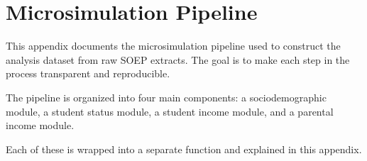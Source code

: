 
%


\newpage
\section{Microsimulation Pipeline}

This appendix documents the microsimulation pipeline used to construct the analysis dataset from raw SOEP extracts. 
The goal is to make each step in the process transparent and reproducible. 

The pipeline is organized into four main components: a sociodemographic module, a student status module, a student income module, and a parental income module. 

Each of these is wrapped into a separate function and explained in this appendix.

